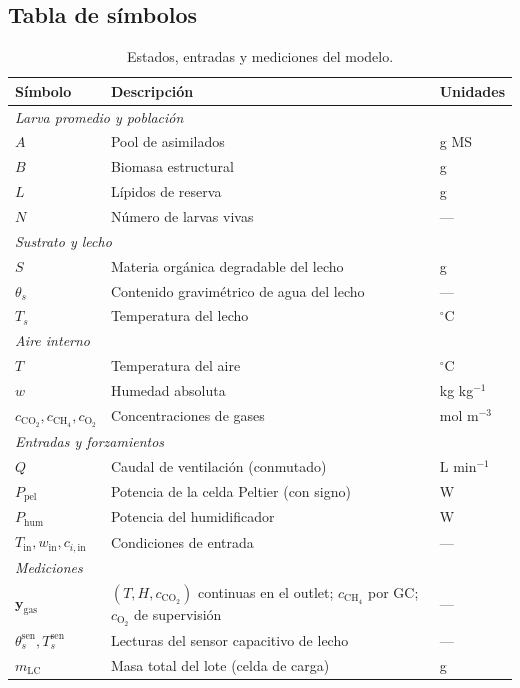 \subsection{Tabla de símbolos}
\begin{table}[H]
  \centering
  \caption{Estados, entradas y mediciones del modelo.}
  \label{tab:simbolos-estados}
  \begin{tabular}{lll}
    \hline
    Símbolo & Descripción & Unidades \\
    \hline
    \multicolumn{3}{l}{\emph{Larva promedio y población}} \\
    $A$ & Pool de asimilados & g MS \\
    $B$ & Biomasa estructural & g \\
    $L$ & Lípidos de reserva & g \\
    $N$ & Número de larvas vivas & --- \\
    \multicolumn{3}{l}{\emph{Sustrato y lecho}} \\
    $S$ & Materia orgánica degradable del lecho & g \\
    $\theta_s$ & Contenido gravimétrico de agua del lecho & --- \\
    $T_s$ & Temperatura del lecho & $^\circ$C \\
    \multicolumn{3}{l}{\emph{Aire interno}} \\
    $T$ & Temperatura del aire & $^\circ$C \\
    $w$ & Humedad absoluta & kg kg$^{-1}$ \\
    $c_{\mathrm{CO_2}}, c_{\mathrm{CH_4}}, c_{\mathrm{O_2}}$ & Concentraciones de gases & mol m$^{-3}$ \\
    \multicolumn{3}{l}{\emph{Entradas y forzamientos}} \\
    $Q$ & Caudal de ventilación (conmutado) & L min$^{-1}$ \\
    $P_{\mathrm{pel}}$ & Potencia de la celda Peltier (con signo) & W \\
    $P_{\mathrm{hum}}$ & Potencia del humidificador & W \\
    $T_{\mathrm{in}}, w_{\mathrm{in}}, c_{i,\mathrm{in}}$ & Condiciones de entrada & --- \\
    \multicolumn{3}{l}{\emph{Mediciones}} \\
    $\mathbf{y}_{\mathrm{gas}}$ & $(T,H,c_{\mathrm{CO_2}})$ continuas en el outlet; $c_{\mathrm{CH_4}}$ por GC; $c_{\mathrm{O_2}}$ de supervisión & --- \\
    $\theta_s^{\mathrm{sen}}, T_s^{\mathrm{sen}}$ & Lecturas del sensor capacitivo de lecho & --- \\
    $m_{\mathrm{LC}}$ & Masa total del lote (celda de carga) & g \\
    \hline
  \end{tabular}
\end{table}

